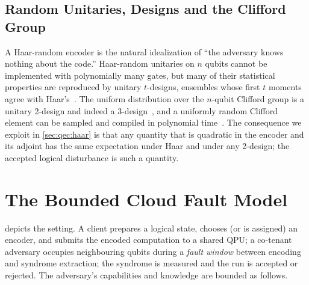 \subsection{Random Unitaries, Designs and the Clifford Group}\label{sec:qec:designs}

A Haar-random encoder is the natural idealization of ``the adversary knows nothing about the code.'' Haar-random unitaries on $n$ qubits cannot be implemented with polynomially many gates, but many of their statistical properties are reproduced by unitary $t$-designs, ensembles whose first $t$ moments agree with Haar's~\cite{dankert2009designs,gross2007designs}. The uniform distribution over the $n$-qubit Clifford group is a unitary 2-design and indeed a 3-design~\cite{webb2016clifford3design}, and a uniformly random Clifford element can be sampled and compiled in polynomial time~\cite{koenig2014clifford,bravyi2021hadamardfree}. The consequence we exploit in \cref{sec:qec:haar} is that any quantity that is quadratic in the encoder and its adjoint has the same expectation under Haar and under any 2-design; the accepted logical disturbance is such a quantity.

\section{The Bounded Cloud Fault Model}\label{sec:qec:threat}

 depicts the setting. A client prepares a logical state, chooses (or is assigned) an encoder, and submits the encoded computation to a shared QPU; a co-tenant adversary occupies neighbouring qubits during a \emph{fault window} between encoding and syndrome extraction; the syndrome is measured and the run is accepted or rejected. The adversary's capabilities and knowledge are bounded as follows.

